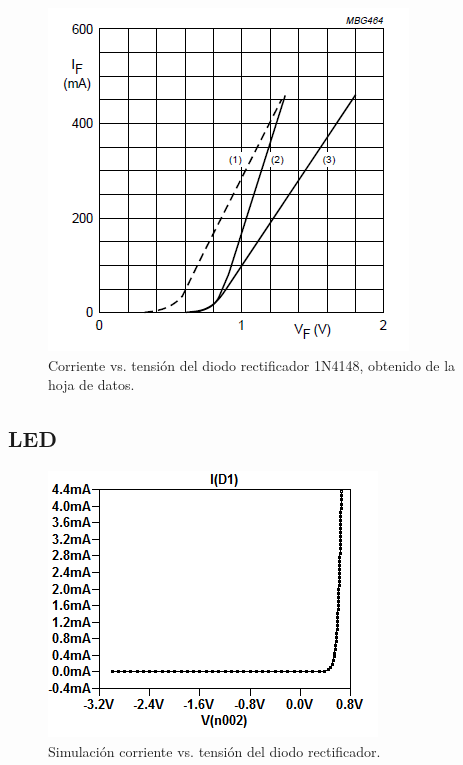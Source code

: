 \begin{figure}[!ht]
\centering
\includegraphics[scale=0.45]{../EJ1/DiodoRectificador/corrienteDiodoDatasheet}
\caption{Corriente vs. tensi\'on del diodo rectificador 1N4148, obtenido de la hoja de datos.}
\label{med2c}
\end{figure}

\subsection*{\color{orange}LED}

\begin{figure}[!ht]
\centering
\includegraphics[scale=0.45]{../EJ1/DiodoRectificador/corrienteDiodo1}
\caption{Simulaci\'on corriente vs. tensi\'on del diodo rectificador.}
\label{med3a}
\end{figure}

